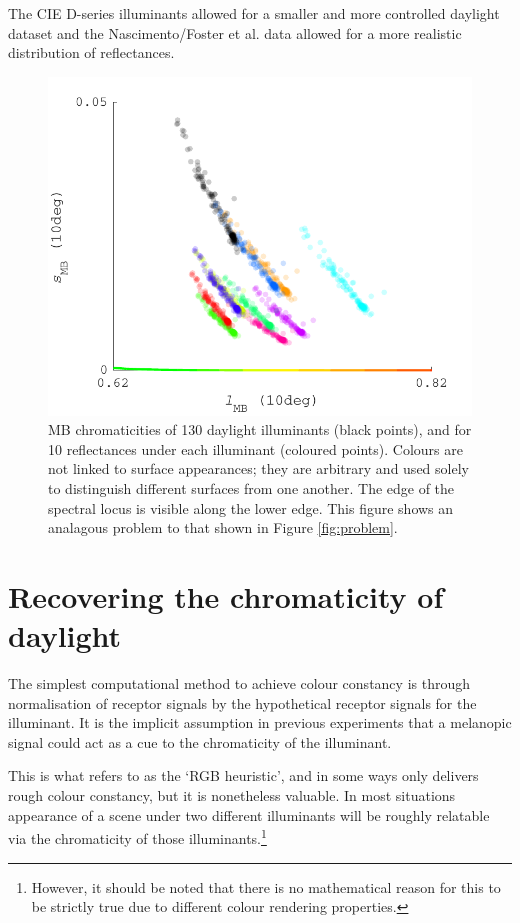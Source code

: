 The CIE D-series illuminants allowed for a smaller and more controlled daylight dataset and the Nascimento/Foster et al. data allowed for a more realistic distribution of reflectances.

\begin{figure}[htbp]
    \includegraphics[max width=\textwidth]{figs/comp/predictingChromaticity/BasicMB_2.pdf}
    \caption{\gls{MB} chromaticities of 130 daylight illuminants (black points), and for 10 reflectances under each illuminant (coloured points). Colours are not linked to surface appearances; they are arbitrary and used solely to distinguish different surfaces from one another. The edge of the spectral locus is visible along the lower edge. This figure shows an analagous problem to that shown in Figure \ref{fig:problem}.}
    \label{fig:MB}
\end{figure} 


\section{Recovering the chromaticity of daylight}

The simplest computational method to achieve colour constancy is through normalisation of receptor signals by the hypothetical receptor signals for the illuminant. It is the implicit assumption in previous experiments that a melanopic signal could act as a cue to the chromaticity of the illuminant.

This is what \citet{maloney_physics-based_2001} refers to as the `RGB heuristic', and in some ways only delivers rough colour constancy, but it is nonetheless valuable. In most situations appearance of a scene under two different illuminants will be roughly relatable via the chromaticity of those illuminants.\footnote{However, it should be noted that there is no mathematical reason for this to be strictly true due to different colour rendering properties.}

